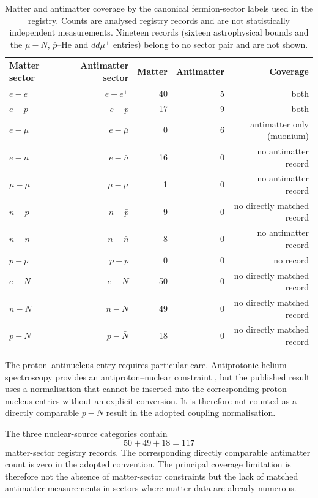 \documentclass[aps,prd,reprint,superscriptaddress,nofootinbib]{revtex4-2}
\begin{document}
	\begin{table}[t]
		\caption{Matter and antimatter coverage by the canonical fermion-sector
			labels used in the registry. Counts are analysed registry records and are not statistically independent measurements. Nineteen records (sixteen astrophysical bounds and the $\mu-N$, $\bar p$--He and $dd\mu^+$ entries) belong to no sector pair and are not shown.}
		\label{tab:sectorcoverage}
		\begin{ruledtabular}
			\begin{tabular}{lrrrr}
				Matter sector & Antimatter sector & Matter & Antimatter
				& Coverage\\
				\hline
				$e-e$ & $e-e^+$ & 40 & 5 & both\\
				$e-p$ & $e-\bar p$ & 17 & 9 & both\\
				$e-\mu$ & $e-\bar\mu$ & 0 & 6 & antimatter only (muonium)\\
				$e-n$ & $e-\bar n$ & 16 & 0 & no antimatter record\\
				$\mu-\mu$ & $\mu-\bar\mu$ & 1 & 0 & no antimatter record\\
				$n-p$ & $n-\bar p$ & 9 & 0 & no directly matched record\\
				$n-n$ & $n-\bar n$ & 8 & 0 & no antimatter record\\
				$p-p$ & $p-\bar p$ & 0 & 0 & no record\\
				$e-N$ & $e-\bar N$ & 50 & 0 & no directly matched record\\
				$n-N$ & $n-\bar N$ & 49 & 0 & no directly matched record\\
				$p-N$ & $p-\bar N$ & 18 & 0 & no directly matched record
			\end{tabular}
		\end{ruledtabular}
	\end{table}
	
	The proton--antinucleus entry requires particular care. Antiprotonic helium spectroscopy provides an antiproton--nuclear constraint \cite{Salumbides2014}, but the published result uses a normalisation that
	cannot be inserted into the corresponding proton--nucleus entries
	without an explicit conversion. It is therefore not counted as a
	directly comparable $p-\bar N$ result in the adopted coupling
	normalisation.
	
	The three nuclear-source categories contain
	\begin{equation}
		50+49+18=117
	\end{equation}
	matter-sector registry records. The corresponding directly comparable
	antimatter count is zero in the adopted convention. The principal
	coverage limitation is therefore not the absence of matter-sector
	constraints but the lack of matched antimatter measurements in sectors
	where matter data are already numerous.
	
\end{document}
